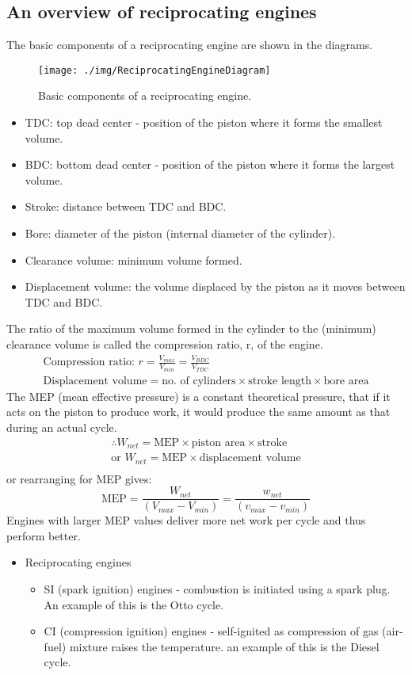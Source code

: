 \subsection{An overview of reciprocating engines}
The basic components of a reciprocating engine are shown in the diagrams.
\begin{figure}
  \centering
  \texttt{[image: ./img/ReciprocatingEngineDiagram]}
  \caption{Basic components of a reciprocating engine.}
\end{figure}
\begin{itemize}[noitemsep]
  \item TDC: top dead center - position of the piston where it forms the smallest volume.
  \item BDC: bottom dead center - position of the piston where it forms the largest volume.
  \item Stroke: distance between TDC and BDC.
  \item Bore: diameter of the piston (internal diameter of the cylinder).
  \item Clearance volume: minimum volume formed.
  \item Displacement volume: the volume displaced by the piston as it moves between TDC and BDC.
\end{itemize}
The ratio of the maximum volume formed in the cylinder to the (minimum) clearance volume is called the compression ratio, r, of the engine.
\begin{gather}
  \textrm{Compression ratio: } r = \frac{V_{max}}{V_{min}} = \frac{V_{BDC}}{V_{TDC}}\\
  \textrm{Displacement volume} = \textrm{no. of cylinders} \times \textrm{stroke length} \times \textrm{bore area}
\end{gather}
The MEP (mean effective pressure) is a constant theoretical pressure, that if it acts on the piston to produce work, it would produce the same amount as that during an actual cycle.
\begin{gather}
  \therefore W_{net} = \textrm{MEP} \times \textrm{piston area} \times \textrm{stroke}\\
  \textrm{or } W_{net} = \textrm{MEP} \times \textrm{displacement volume}\\
\end{gather}
or rearranging for MEP gives:
\begin{equation}
  \textrm{MEP} = \frac{W_{net}}{(V_{max} - V_{min})} = \frac{w_{net}}{(v_{max} - v_{min})}
\end{equation}
Engines with larger MEP values deliver more net work per cycle and thus perform better.
\begin{itemize}[noitemsep]
  \item Reciprocating engines
        \begin{itemize}[noitemsep]
          \item SI (spark ignition) engines - combustion is initiated using a spark plug. An example of this is the Otto cycle.
          \item CI (compression ignition) engines - self-ignited as compression of gas (air-fuel) mixture raises the temperature. an example of this is the Diesel cycle.
        \end{itemize}
\end{itemize}
